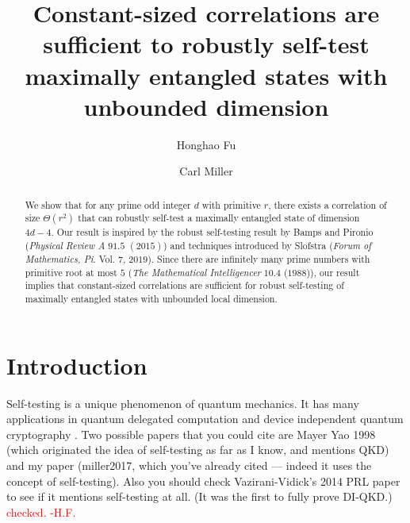 \documentclass[11pt,letterpaper]{article}
\newcommand{\1}{\mathbb{1}}
\def\carl#1{{\color{blue} #1}}
\newcommand{\hfc}[1]{\textcolor{red}{#1 -H.F.}}
\theoremstyle{definition}
\begin{document}
\title{Constant-sized correlations are sufficient to 
robustly self-test maximally entangled states with unbounded dimension}

\author[1]{Honghao Fu}
\author[1,2]{Carl Miller}

\renewcommand\Affilfont{\itshape\small}



\maketitle

\begin{abstract}
	We show that for any prime odd integer $d$ with primitive $r$, there exists a correlation of size
	$\Theta(r^2)$ 
	that can robustly self-test a maximally entangled state of dimension $4d-4$. Our result is
	inspired by the robust self-testing result by Bamps and Pironio (\textit{Physical Review A} $91.5$ $(2015)$) and
	techniques introduced by Slofstra (\textit{Forum of Mathematics, Pi}. Vol. $7$, $2019$). Since there are
	infinitely many prime numbers with primitive root at most $5$ (\textit{The Mathematical Intelligencer} $10.4$ ($1988$)), 
	our result implies that constant-sized correlations are sufficient for robust self-testing of maximally entangled states
	with unbounded local dimension.
\end{abstract}
\section{Introduction}
\label{sec:intro}
Self-testing is a unique phenomenon of quantum mechanics. It has many applications in quantum
delegated computation \cite{ruv2013,coladan2017verifier} and device independent quantum cryptography
\cite{mayersyao,vv2014,miller2017,fu2018,eat2018}.
\carl{Two possible papers that you could cite are Mayer Yao 1998 (which originated the idea of self-testing as far as I know, and mentions QKD) and my paper (miller2017, which you've already cited --- indeed it uses the concept of self-testing).  Also you should check Vazirani-Vidick's 2014 PRL paper to see if it mentions self-testing at all.  (It was the first to fully prove DI-QKD.)}
\hfc{checked.}
\end{document}
